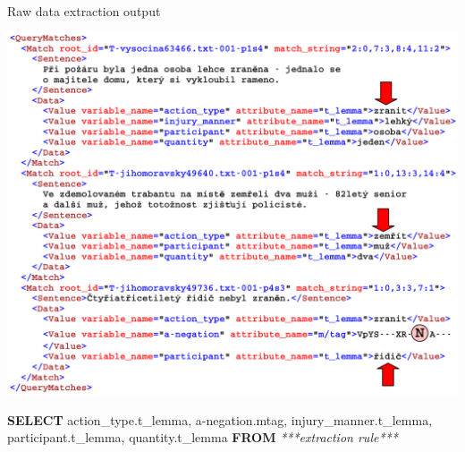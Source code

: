 \documentclass[xcolor=dvipsnames]{beamer}
\begin{document}
\begin{frame}{Raw data extraction output}
\centerline{\includegraphics[height=0.75\vsize]{img/OutputQueryMatches}}

{\scriptsize
\textbf{SELECT} \alert{action\_type}.t\_lemma, \alert{a-negation}.m\/tag, 
\alert{injury\_manner}.t\_lemma, \alert{participant}.t\_lemma,
\alert{quantity}.t\_lemma \textbf{FROM} \emph{***extraction rule***} 
}
\end{frame}
\end{document}
